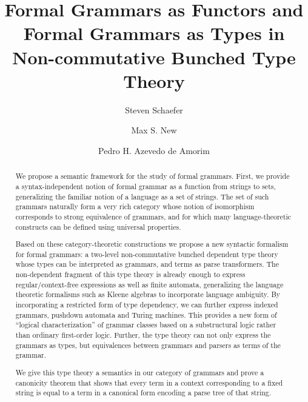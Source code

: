 \documentclass[sigconf,anonymous,review,screen]{acmart}
\begin{document}
\title{Formal Grammars as Functors and Formal Grammars as Types in Non-commutative Bunched Type Theory}
\author{Steven Schaefer}

\author{Max S. New}

\author{Pedro H. Azevedo de Amorim}

\begin{abstract}
  We propose a semantic framework for the study of formal
  grammars. First, we provide a syntax-independent notion of formal
  grammar as a function from strings to sets, generalizing the
  familiar notion of a language as a set of strings. The set of such
  grammars naturally form a very rich category whose notion of
  isomorphism corresponds to strong equivalence of grammars, and for
  which many language-theoretic constructs can be defined using
  universal properties.

  Based on these category-theoretic constructions we propose a new
  syntactic formalism for formal grammars: a two-level non-commutative
  bunched dependent type theory whose types can be interpreted as
  grammars, and terms as parse transformers. The non-dependent
  fragment of this type theory is already enough to express
  regular/context-free expressions as well as finite automata,
  generalizing the language theoretic formalisms such as Kleene
  algebras to incorporate language ambiguity. By incorporating a
  restricted form of type dependency, we can further express indexed
  grammars, pushdown automata and Turing machines. This provides a new
  form of ``logical characterization'' of grammar classes based on a
  substructural logic rather than ordinary first-order logic. Further,
  the type theory can not only express the grammars as types, but
  equivalences between grammars and parsers as terms of the grammar.

  We give this type theory a semantics in our category of grammars and
  prove a canonicity theorem that shows that every term in a context
  corresponding to a fixed string is equal to a term in a canonical
  form encoding a parse tree of that string.
\end{abstract}
\end{document}
